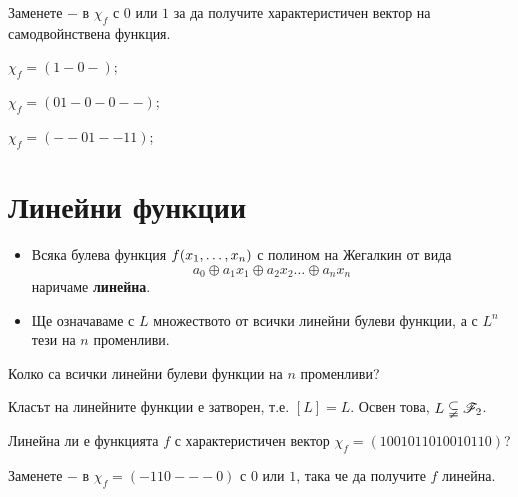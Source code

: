 \begin{problem}
  Заменете $-$ в $\chi_f$ с $0$ или $1$ за да получите характеристичен вектор на самодвойнствена функция.\\
  \begin{inparaenum}[a)]
  \item
    $\chi_f = (1-0-)$;
  \item
    $\chi_f = (01-0-0--)$;
  \item
    $\chi_f = (--01--11)$;
  \end{inparaenum}
\end{problem}

\section{Линейни функции}

\begin{itemize}
\item 
  Всяка булева функция $f(x_{1},\dots,x_{n})$ с полином на Жегалкин от вида 
  \[a_0\oplus a_1x_1 \oplus a_2x_2 \dots\oplus a_nx_n\] наричаме {\bf линейна}.
\item
  Ще означаваме с $L$ множеството от всички линейни булеви функции, а с $L^n$ тези на $n$ променливи.
\end{itemize}

\begin{problem}
  Колко са всички линейни булеви функции на $n$ променливи?
\end{problem}


\begin{prop}
  Класът на линейните функции е затворен, т.е. $[L] = L$.
  Освен това, $L \subsetneqq \mathscr{F}_2$.
\end{prop}


\begin{problem}
  Линейна ли е функцията $f$ с характеристичен вектор $\chi_f = (1001011010010110)$?
\end{problem}

\begin{problem}
  Заменете $-$ в $\chi_f = (-110---0)$ с $0$ или $1$, така че да получите $f$ линейна.
\end{problem}


